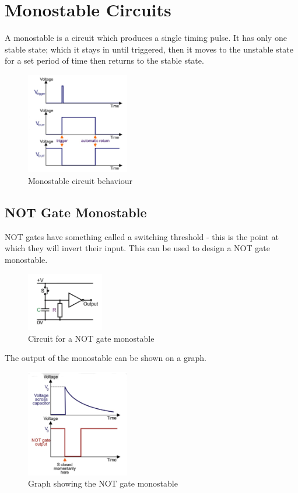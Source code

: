 \documentclass[a4paper,11pt, twocolumn]{article}
\begin{document}
\section{Monostable Circuits}
A monostable is a circuit which produces a single timing pulse. It has only one stable state; which it stays in until triggered, then it moves to the unstable state for a set period of time then returns to the stable state.
\begin{figure}[H]
    \centering
    \includegraphics[width=0.4\textwidth]{images/monoBehav.jpg}
    \caption{Monostable circuit behaviour}
    \label{fig:monoBehav}
\end{figure}
\subsection{NOT Gate Monostable}
NOT gates have something called a switching threshold - this is the point at which they will invert their input. This can be used to design a NOT gate monostable.
\begin{figure}[H]
    \centering
    \includegraphics[width=0.3\textwidth]{images/monoNot.jpg}
    \caption{Circuit for a NOT gate monostable}
    \label{fig:monoNot}
\end{figure}
\noindent The output of the monostable can be shown on a graph.
\begin{figure}[H]
    \centering
    \includegraphics[width=0.4\textwidth]{images/monoNotGraph.jpg}
    \caption{Graph showing the NOT gate monostable}
    \label{fig:monoNotGraph}
\end{figure}
\end{document}
